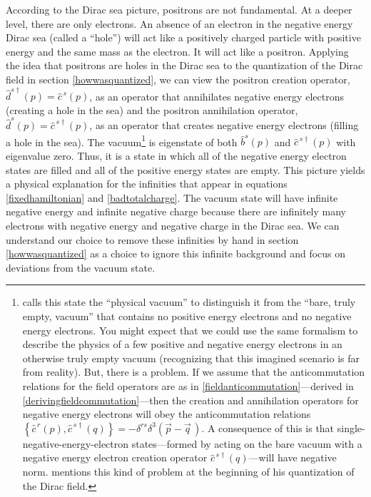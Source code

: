 \documentclass[onecolumn,secnumarabic,amsmath,amssymb,balancelastpage,nofootinbib]{article}
\begin{document}
According to the Dirac sea picture, positrons are not fundamental.  At a deeper level, there are only electrons.  An absence of an electron in the negative energy Dirac sea (called a ``hole'') will act like a positively charged particle with positive energy and the same mass as the electron.  It will act like a positron.  Applying the idea that positrons are holes in the Dirac sea to the quantization of the Dirac field in section \ref{howwasquantized}, we can view the positron creation operator, $\widehat{d}^{s\dagger}(p)=\widehat{c}^{\,s}(p)$, as an operator that annihilates negative energy electrons (creating a hole in the sea) and the positron annihilation operator, $\widehat{d}^{s}(p)=\widehat{c}^{\,s\dagger}(p)$, as an operator that creates negative energy electrons (filling a hole in the sea).  The vacuum\footnote{\citet[pg.\ 70]{hatfield} calls this state the ``physical vacuum'' to distinguish it from the ``bare, truly empty, vacuum'' that contains no positive energy electrons and no negative energy electrons.  You might expect that we could use the same formalism to describe the physics of a few positive and negative energy electrons in an otherwise truly empty vacuum (recognizing that this imagined scenario is far from reality).  But, there is a problem.  If we assume that the anticommutation relations for the field operators are as in \eqref{fieldanticommutation}---derived in \eqref{derivingfieldcommutation}---then the creation and annihilation operators for negative energy electrons will obey the anticommutation relations $\left\{\widehat{c}^{\,r}(p),\widehat{c}^{\,s \dagger}(q)\right\}= - \delta^{rs}\delta^3(\vec{p}-\vec{q}\,)$.  A consequence of this is that single-negative-energy-electron states---formed by acting on the bare vacuum with a negative energy electron creation operator $\widehat{c}^{\,s \dagger}(q)$---will have negative norm.  \citet[sec.\ 5.1]{tong} mentions this kind of problem at the beginning of his quantization of the Dirac field.} is eigenstate of both $\widehat{b}^{s}(p)$ and $\widehat{c}^{\,s\dagger}(p)$ with eigenvalue zero.  Thus, it is a state in which all of the negative energy electron states are filled and all of the positive energy states are empty.  This picture yields a physical explanation for the infinities that appear in equations \eqref{fixedhamiltonian} and \eqref{badtotalcharge}.  The vacuum state will have infinite negative energy and infinite negative charge because there are infinitely many electrons with negative energy and negative charge in the Dirac sea.  We can understand our choice to remove these infinities by hand in section \ref{howwasquantized} as a choice to ignore this infinite background and focus on deviations from the vacuum state.
\end{document}
